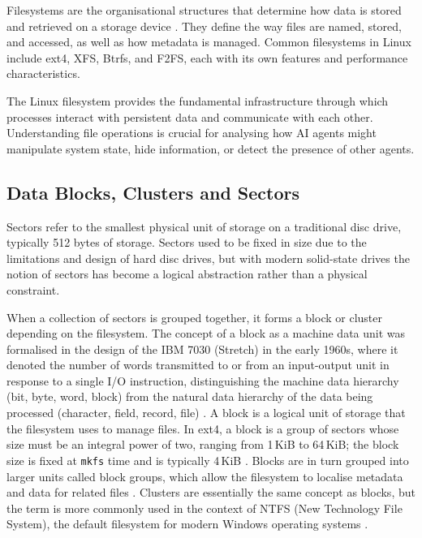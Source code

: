 
Filesystems are the organisational structures that determine how data is stored and retrieved on a storage device \parencite{LinuxSAGFilesystems}. They define the way files are named, stored, and accessed, as well as how metadata is managed. Common filesystems in Linux include ext4, XFS, Btrfs, and F2FS, each with its own features and performance characteristics.

The Linux filesystem provides the fundamental infrastructure through which processes interact with persistent data and communicate with each other. Understanding file operations is crucial for analysing how AI agents might manipulate system state, hide information, or detect the presence of other agents.

\subsection{Data Blocks, Clusters and Sectors}
\label{DataBlocks}

Sectors refer to the smallest physical unit of storage on a traditional disc drive, typically 512 bytes of storage. Sectors used to be fixed in size due to the limitations and design of hard disc drives, but with modern solid-state drives the notion of sectors has become a logical abstraction rather than a physical constraint.

When a collection of sectors is grouped together, it forms a block or cluster depending on the filesystem. The concept of a block as a machine data unit was formalised in the design of the IBM 7030 (Stretch) in the early 1960s, where it denoted the number of words transmitted to or from an input-output unit in response to a single I/O instruction, distinguishing the machine data hierarchy (bit, byte, word, block) from the natural data hierarchy of the data being processed (character, field, record, file) \parencite{ProjectStretch}. A block is a logical unit of storage that the filesystem uses to manage files. In ext4, a block is a group of sectors whose size must be an integral power of two, ranging from 1\,KiB to 64\,KiB; the block size is fixed at \texttt{mkfs} time and is typically 4\,KiB \parencite{KernelExt4Blocks}. Blocks are in turn grouped into larger units called block groups, which allow the filesystem to localise metadata and data for related files \parencite{KernelExt4Blocks}. Clusters are essentially the same concept as blocks, but the term is more commonly used in the context of NTFS (New Technology File System), the default filesystem for modern Windows operating systems \parencite{MicrosoftNTFS}.

